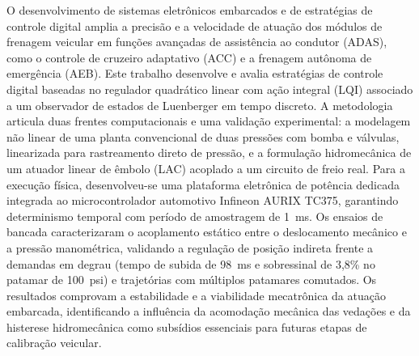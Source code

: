 \noindent O desenvolvimento de sistemas eletrônicos embarcados e de estratégias de controle digital amplia a precisão e a velocidade de atuação dos módulos de frenagem veicular em funções avançadas de assistência ao condutor (ADAS), como o controle de cruzeiro adaptativo (ACC) e a frenagem autônoma de emergência (AEB). Este trabalho desenvolve e avalia estratégias de controle digital baseadas no regulador quadrático linear com ação integral (LQI) associado a um observador de estados de Luenberger em tempo discreto. A metodologia articula duas frentes computacionais e uma validação experimental: a modelagem não linear de uma planta convencional de duas pressões com bomba e válvulas, linearizada para rastreamento direto de pressão, e a formulação hidromecânica de um atuador linear de êmbolo (LAC) acoplado a um circuito de freio real. Para a execução física, desenvolveu-se uma plataforma eletrônica de potência dedicada integrada ao microcontrolador automotivo Infineon AURIX TC375, garantindo determinismo temporal com período de amostragem de 1~ms. Os ensaios de bancada caracterizaram o acoplamento estático entre o deslocamento mecânico e a pressão manométrica, validando a regulação de posição indireta frente a demandas em degrau (tempo de subida de 98~ms e sobressinal de 3{,}8\% no patamar de 100~psi) e trajetórias com múltiplos patamares comutados. Os resultados comprovam a estabilidade e a viabilidade mecatrônica da atuação embarcada, identificando a influência da acomodação mecânica das vedações e da histerese hidromecânica como subsídios essenciais para futuras etapas de calibração veicular.

\vspace{\baselineskip}
\noindent{}